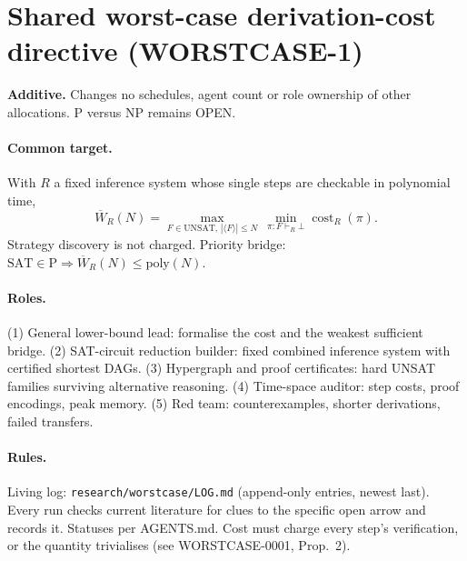 \documentclass{article}
\begin{document}
\section*{Shared worst-case derivation-cost directive (WORSTCASE-1)}
\textbf{Additive.} Changes no schedules, agent count or role ownership of other allocations. P versus NP remains OPEN.

\paragraph{Common target.} With $R$ a fixed inference system whose single steps are checkable in polynomial time,
\[
\overline W_R(N)=\max_{F\in\mathrm{UNSAT},\,|\langle F\rangle|\le N}\ \min_{\pi:F\vdash_R\bot}\operatorname{cost}_R(\pi).
\]
Strategy discovery is not charged. Priority bridge: $\mathrm{SAT}\in\mathrm P\Rightarrow\overline W_R(N)\le\mathrm{poly}(N)$.

\paragraph{Roles.} (1) General lower-bound lead: formalise the cost and the weakest sufficient bridge. (2) SAT-circuit reduction builder: fixed combined inference system with certified shortest DAGs. (3) Hypergraph and proof certificates: hard UNSAT families surviving alternative reasoning. (4) Time-space auditor: step costs, proof encodings, peak memory. (5) Red team: counterexamples, shorter derivations, failed transfers.

\paragraph{Rules.} Living log: \texttt{research/worstcase/LOG.md} (append-only entries, newest last). Every run checks current literature for clues to the specific open arrow and records it. Statuses per AGENTS.md. Cost must charge every step's verification, or the quantity trivialises (see WORSTCASE-0001, Prop.~2).
\end{document}
